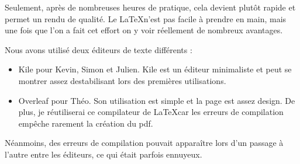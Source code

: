                     Seulement, après de nombreuses heures de pratique, cela devient plutôt rapide et permet un rendu de qualité. Le \LaTeX n'est pas facile à prendre en main, mais une fois que l'on a fait cet effort on y voir réellement de nombreux avantages.

                    \clearpage
                    
                    Nous avons utilisé deux éditeurs de texte différents : 
                    
                \begin{itemize}
                    \vspace{0,2 cm}
                    
                    \item Kile pour Kevin, Simon et Julien. Kile est un éditeur minimaliste et peut se montrer assez destabilisant lors des premières utilisations.
                    \item Overleaf pour Théo. Son utilisation est simple et la page est assez design. De plus, je réutiliserai ce compilateur de \LaTeX car les erreurs de compilation empêche rarement la création du pdf. 
                    
                    \vspace{0,2 cm}
                \end{itemize}

            \par
                Néanmoins, des erreurs de compilation pouvait apparaître lors d'un passage à l'autre entre les éditeurs, ce qui était parfois ennuyeux.
                
